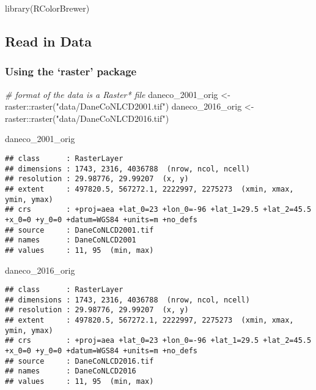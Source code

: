 \documentclass[
]{article}
\newenvironment{Shaded}{\begin{snugshade}}{\end{snugshade}}
\newcommand{\CommentTok}[1]{\textcolor[rgb]{0.56,0.35,0.01}{\textit{#1}}}
\newcommand{\FunctionTok}[1]{\textcolor[rgb]{0.00,0.00,0.00}{#1}}
\newcommand{\NormalTok}[1]{#1}
\newcommand{\OtherTok}[1]{\textcolor[rgb]{0.56,0.35,0.01}{#1}}
\newcommand{\SpecialCharTok}[1]{\textcolor[rgb]{0.00,0.00,0.00}{#1}}
\newcommand{\StringTok}[1]{\textcolor[rgb]{0.31,0.60,0.02}{#1}}
\begin{document}
\begin{Shaded}
\begin{Highlighting}[]
\FunctionTok{library}\NormalTok{(RColorBrewer)}
\end{Highlighting}
\end{Shaded}

\hypertarget{read-in-data}{%
\subsection{Read in Data}\label{read-in-data}}

\hypertarget{using-the-raster-package}{%
\subsubsection{Using the `raster'
package}\label{using-the-raster-package}}

\begin{Shaded}
\begin{Highlighting}[]
\CommentTok{\# format of the data is a Raster* file}
\NormalTok{daneco\_2001\_orig }\OtherTok{\textless{}{-}}\NormalTok{ raster}\SpecialCharTok{::}\FunctionTok{raster}\NormalTok{(}\StringTok{"data/DaneCoNLCD2001.tif"}\NormalTok{)}
\NormalTok{daneco\_2016\_orig }\OtherTok{\textless{}{-}}\NormalTok{ raster}\SpecialCharTok{::}\FunctionTok{raster}\NormalTok{(}\StringTok{"data/DaneCoNLCD2016.tif"}\NormalTok{)}

\NormalTok{daneco\_2001\_orig}
\end{Highlighting}
\end{Shaded}

\begin{verbatim}
## class      : RasterLayer 
## dimensions : 1743, 2316, 4036788  (nrow, ncol, ncell)
## resolution : 29.98776, 29.99207  (x, y)
## extent     : 497820.5, 567272.1, 2222997, 2275273  (xmin, xmax, ymin, ymax)
## crs        : +proj=aea +lat_0=23 +lon_0=-96 +lat_1=29.5 +lat_2=45.5 +x_0=0 +y_0=0 +datum=WGS84 +units=m +no_defs 
## source     : DaneCoNLCD2001.tif 
## names      : DaneCoNLCD2001 
## values     : 11, 95  (min, max)
\end{verbatim}

\begin{Shaded}
\begin{Highlighting}[]
\NormalTok{daneco\_2016\_orig}
\end{Highlighting}
\end{Shaded}

\begin{verbatim}
## class      : RasterLayer 
## dimensions : 1743, 2316, 4036788  (nrow, ncol, ncell)
## resolution : 29.98776, 29.99207  (x, y)
## extent     : 497820.5, 567272.1, 2222997, 2275273  (xmin, xmax, ymin, ymax)
## crs        : +proj=aea +lat_0=23 +lon_0=-96 +lat_1=29.5 +lat_2=45.5 +x_0=0 +y_0=0 +datum=WGS84 +units=m +no_defs 
## source     : DaneCoNLCD2016.tif 
## names      : DaneCoNLCD2016 
## values     : 11, 95  (min, max)
\end{verbatim}
\end{document}
